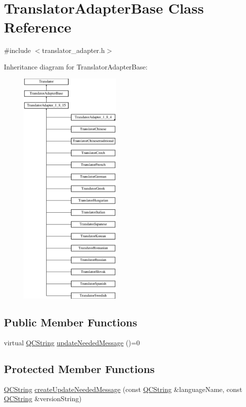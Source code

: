 \hypertarget{class_translator_adapter_base}{}\section{Translator\+Adapter\+Base Class Reference}
\label{class_translator_adapter_base}


{\ttfamily \#include $<$translator\+\_\+adapter.\+h$>$}

Inheritance diagram for Translator\+Adapter\+Base\+:\begin{figure}[H]
\begin{center}
\leavevmode
\includegraphics[height=12.000000cm]{class_translator_adapter_base}
\end{center}
\end{figure}
\subsection*{Public Member Functions}
\begin{DoxyCompactItemize}
\item 
virtual \mbox{\hyperlink{class_q_c_string}{Q\+C\+String}} \mbox{\hyperlink{class_translator_adapter_base_acc5b89c39bae2a9bca490016ec15c79f}{update\+Needed\+Message}} ()=0
\end{DoxyCompactItemize}
\subsection*{Protected Member Functions}
\begin{DoxyCompactItemize}
\item 
\mbox{\hyperlink{class_q_c_string}{Q\+C\+String}} \mbox{\hyperlink{class_translator_adapter_base_a71493b87a34d6e4c232e540734aba698}{create\+Update\+Needed\+Message}} (const \mbox{\hyperlink{class_q_c_string}{Q\+C\+String}} \&language\+Name, const \mbox{\hyperlink{class_q_c_string}{Q\+C\+String}} \&version\+String)
\end{DoxyCompactItemize}
